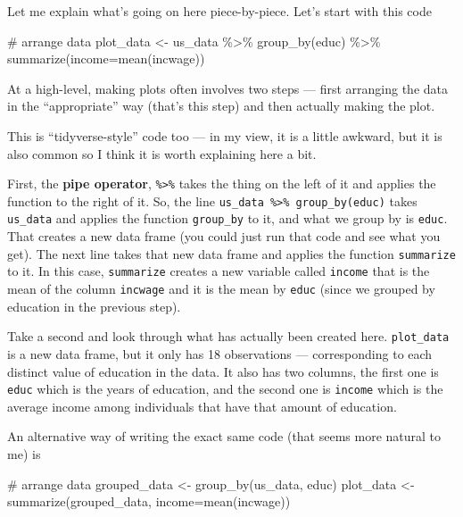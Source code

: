 \documentclass[
  letterpaper,
  DIV=11,
  numbers=noendperiod]{scrreprt}
\newenvironment{Shaded}{\begin{snugshade}}{\end{snugshade}}
\newcommand{\AttributeTok}[1]{\textcolor[rgb]{0.40,0.45,0.13}{#1}}
\newcommand{\CommentTok}[1]{\textcolor[rgb]{0.37,0.37,0.37}{#1}}
\newcommand{\FunctionTok}[1]{\textcolor[rgb]{0.28,0.35,0.67}{#1}}
\newcommand{\NormalTok}[1]{\textcolor[rgb]{0.00,0.23,0.31}{#1}}
\newcommand{\OtherTok}[1]{\textcolor[rgb]{0.00,0.23,0.31}{#1}}
\newcommand{\SpecialCharTok}[1]{\textcolor[rgb]{0.37,0.37,0.37}{#1}}
\begin{document}
Let me explain what's going on here piece-by-piece. Let's start with
this code

\begin{Shaded}
\begin{Highlighting}[]
\CommentTok{\# arrange data}
\NormalTok{plot\_data }\OtherTok{\textless{}{-}}\NormalTok{ us\_data }\SpecialCharTok{\%\textgreater{}\%}
    \FunctionTok{group\_by}\NormalTok{(educ) }\SpecialCharTok{\%\textgreater{}\%}
    \FunctionTok{summarize}\NormalTok{(}\AttributeTok{income=}\FunctionTok{mean}\NormalTok{(incwage))}
\end{Highlighting}
\end{Shaded}

At a high-level, making plots often involves two steps --- first
arranging the data in the ``appropriate'' way (that's this step) and
then actually making the plot.

This is ``tidyverse-style'' code too --- in my view, it is a little
awkward, but it is also common so I think it is worth explaining here a
bit.

First, the \textbf{pipe operator}, \texttt{\%\textgreater{}\%} takes the
thing on the left of it and applies the function to the right of it. So,
the line \texttt{us\_data\ \%\textgreater{}\%\ group\_by(educ)} takes
\texttt{us\_data} and applies the function \texttt{group\_by} to it, and
what we group by is \texttt{educ}. That creates a new data frame (you
could just run that code and see what you get). The next line takes that
new data frame and applies the function \texttt{summarize} to it. In
this case, \texttt{summarize} creates a new variable called
\texttt{income} that is the mean of the column \texttt{incwage} and it
is the mean by \texttt{educ} (since we grouped by education in the
previous step).

Take a second and look through what has actually been created here.
\texttt{plot\_data} is a new data frame, but it only has 18 observations
--- corresponding to each distinct value of education in the data. It
also has two columns, the first one is \texttt{educ} which is the years
of education, and the second one is \texttt{income} which is the average
income among individuals that have that amount of education.

An alternative way of writing the exact same code (that seems more
natural to me) is

\begin{Shaded}
\begin{Highlighting}[]
\CommentTok{\# arrange data}
\NormalTok{grouped\_data }\OtherTok{\textless{}{-}} \FunctionTok{group\_by}\NormalTok{(us\_data, educ)}
\NormalTok{plot\_data }\OtherTok{\textless{}{-}} \FunctionTok{summarize}\NormalTok{(grouped\_data, }\AttributeTok{income=}\FunctionTok{mean}\NormalTok{(incwage))}
\end{Highlighting}
\end{Shaded}
\end{document}
